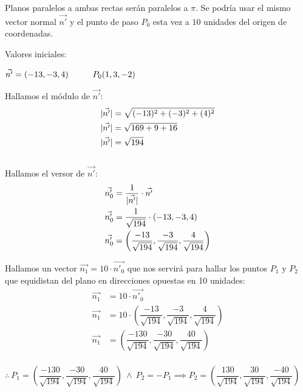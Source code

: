 \noindent Planos paralelos a ambas rectas serán paralelos a $\pi$. Se podría usar el mismo vector normal $\vec{n'}$ y el punto de paso $P_0$ esta vez a $10$ unidades del origen de coordenadas.

\noindent Valores iniciales:
\begin{center}
	$\vec{n'} = (-13, -3, 4) \hspace*{1cm} P_0(1, 3, -2)$
\end{center}

\begin{multicols}{2}
	\noindent Hallamos el módulo de $\vec{n'}$:
	\begin{align*}
		\lvert\vec{n'}\rvert & = \sqrt{(-13)^2 + (-3)^2 + (4)^2} \\
		\lvert\vec{n'}\rvert & = \sqrt{169 + 9 + 16}             \\
		\lvert\vec{n'}\rvert & = \sqrt{194}
	\end{align*}
	\columnbreak \\
	\noindent Hallamos el versor de $\vec{n'}$:
	\begin{align*}
		\vec{n'_0} & = \dfrac{1}{\lvert\vec{n'}\rvert} \cdot \vec{n'}                                             \\
		\vec{n'_0} & = \dfrac{1}{\sqrt{194}} \cdot (-13, -3, 4)                                             \\
		\vec{n'_0} & = \left(\dfrac{-13}{\sqrt{194}}, \dfrac{-3}{\sqrt{194}}, \dfrac{4}{\sqrt{194}} \right)
	\end{align*}
\end{multicols}

\noindent Hallamos un vector $\vec{n_1} = 10 \cdot \vec{n'_0}$ que nos servirá para hallar los puntos $P_1$ y $P_2$ que equidistan del plano en direcciones opuestas en 10 unidades:
\begin{align*}
	\vec{n_1} & = 10 \cdot \vec{n'_0}                                                                           \\
	\vec{n_1} & = 10 \cdot \left(\dfrac{-13}{\sqrt{194}}, \dfrac{-3}{\sqrt{194}}, \dfrac{4}{\sqrt{194}} \right) \\
	\vec{n_1} & = \left(\dfrac{-130}{\sqrt{194}}, \dfrac{-30}{\sqrt{194}}, \dfrac{40}{\sqrt{194}} \right)       \\
\end{align*}
\begin{center}
	$\therefore \ \boxed{P_1 = \left(\dfrac{-130}{\sqrt{194}}, \dfrac{-30}{\sqrt{194}}, \dfrac{40}{\sqrt{194}} \right)}
		\ \land \ P_2 = -P_1 \implies
		\boxed{P_2 = \left(\dfrac{130}{\sqrt{194}}, \dfrac{30}{\sqrt{194}}, \dfrac{-40}{\sqrt{194}} \right)}$
\end{center}

